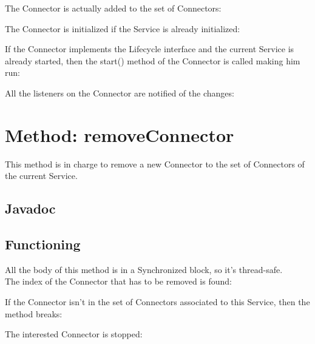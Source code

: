 \documentclass[../../codeInspection.tex]{subfiles}
\begin{document}
			The Connector is actually added to the set of Connectors:
			

			The Connector is initialized if the Service is already initialized:
			

			If the Connector implements the Lifecycle interface and the current Service is already started, then the start() method of the Connector is called making him run:
			

			All the listeners on the Connector are notified of the changes:
			

	\section{Method: removeConnector}

		This method is in charge to remove a new Connector to the set of Connectors of the current Service.

		\subsection{Javadoc}
			

		\subsection{Functioning}
			All the body of this method is in a Synchronized block, so it's thread-safe.\\

			The index of the Connector that has to be removed is found:
			

			If the Connector isn't in the set of Connectors associated to this Service, then the method breaks:
			

			The interested Connector is stopped:
			
\end{document}
